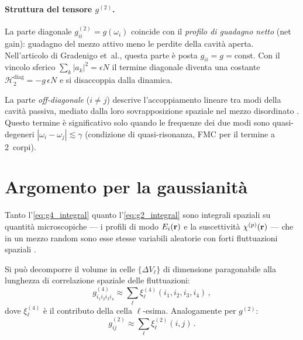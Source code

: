 \documentclass[11pt,a4paper]{article}
\begin{document}
\paragraph{Struttura del tensore $g^{(2)}$.}
La parte diagonale $g^{(2)}_{ii} = g(\omega_i)$ coincide con il
\emph{profilo di guadagno netto} (net gain): guadagno del mezzo attivo
meno le perdite della cavit\`a aperta. Nell'articolo di Gradenigo
et~al.\@ \cite{Gradenigo2020}, questa parte \`e posta $g_{ii} = g =
\mathrm{const}$. Con il vincolo sferico
$\sum_k |a_k|^2 = \epsilon N$ il termine diagonale diventa una costante
$\mathcal{H}_2^{\mathrm{diag}} = -g\,\epsilon N$ e si disaccoppia dalla
dinamica.

La parte \emph{off-diagonale} ($i \neq j$) descrive l'accoppiamento
lineare tra modi della cavit\`a passiva, mediato dalla loro
sovrapposizione spaziale nel mezzo disordinato
\cite{Hackenbroich2003, Viviescas2003}. Questo termine \`e significativo
solo quando le frequenze dei due modi sono quasi-degeneri
$|\omega_i - \omega_j| \lesssim \gamma$ (condizione di quasi-risonanza,
FMC per il termine a 2~corpi).

\section{Argomento per la gaussianit\`a}\label{sec:clt}

Tanto l'\cref{eq:g4_integral} quanto l'\cref{eq:g2_integral} sono
integrali spaziali su quantit\`a microscopiche --- i profili di modo
$E_i(\vb{r})$ e la suscettivit\`a $\chi^{(p)}(\vb{r})$ --- che in
un mezzo random sono esse stesse variabili aleatorie con forti
fluttuazioni spaziali \cite{Fallert2009, Conti2008}.

Si pu\`o decomporre il volume in celle $\{\Delta V_\ell\}$ di dimensione
paragonabile alla lunghezza di correlazione spaziale delle fluttuazioni:
\begin{equation}\label{eq:g4_sum}
  g^{(4)}_{i_1 i_2 i_3 i_4}
  \approx
  \sum_\ell \xi_\ell^{(4)}(i_1,i_2,i_3,i_4)\,,
\end{equation}
dove $\xi_\ell^{(4)}$ \`e il contributo della cella $\ell$-esima.
Analogamente per $g^{(2)}$:
\begin{equation}\label{eq:g2_sum}
  g^{(2)}_{ij}
  \approx
  \sum_\ell \xi_\ell^{(2)}(i,j)\,.
\end{equation}
\end{document}

